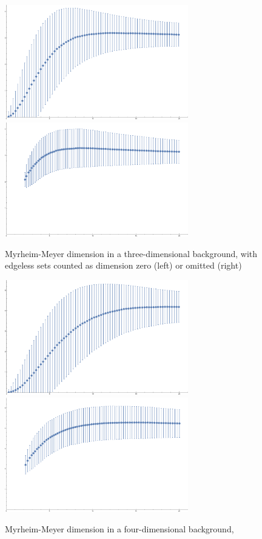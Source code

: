 \documentclass[12pt]{article}
\begin{document}
\begin{figure}
\begin{center}
\includegraphics[width=3.15in]{CSDimRed3D.pdf}
 \includegraphics[width=3.15in]{CSDimRed3D2.pdf}
\caption{Myrheim-Meyer dimension in a three-dimensional background,
with edgeless sets counted as dimension zero (left) or omitted (right) \label{fig2}}
\end{center}
\begin{center}
\includegraphics[width=3.15in]{CSDimRed.pdf}
 \includegraphics[width=3.15in]{CSDimRed2.pdf}
\caption{Myrheim-Meyer dimension in a four-dimensional background,
}
\end{center}
\end{figure}
\end{document}
